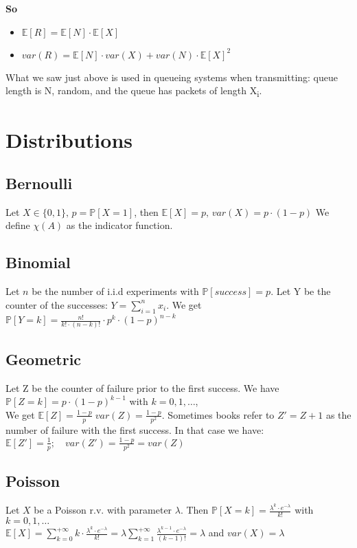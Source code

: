 \textbf{So}
\begin{itemize}
  \item $\mathbb{E}[R] = \mathbb{E}[N] \cdot \mathbb{E}[X]$
  \item $var(R) = \mathbb{E}[N] \cdot var(X) + var(N) \cdot \mathbb{E}[X]^2$
\end{itemize}

What we saw just above is used in queueing systems when transmitting: queue length is N, random,
and the queue has packets of length X\textsubscript{i}.

\section{Distributions}
\subsection{Bernoulli}
Let $X \in \{0,1\}, \, p = \mathbb{P}[X=1]$, then $\mathbb{E}[X]=p, \, var(X)=p \cdot (1-p)$
We define $\chi(A)$ as the indicator function.

\subsection{Binomial}
Let $n$ be the number of i.i.d experiments with $\mathbb{P}[success]=p$. Let Y be the counter of the successes:
$Y=\sum\limits_{i=1}^{n} x_i$. We get $\mathbb{P}[Y=k]= \frac{n!}{k! \cdot (n-k)!}\cdot p^k \cdot (1-p)^{n-k}$

\subsection{Geometric}
Let Z be the counter of failure prior to the first success. We have $\mathbb{P}[Z=k] = p \cdot (1-p)^{k-1}$ with $k=0,1,\dots$, \\
We get $\mathbb{E}[Z]=\frac{1-p}{p} \; var(Z)=\frac{1-p}{p^2}$.
Sometimes books refer to $Z'=Z+1$ as the number of failure with the first success. In that case we have:\\
$\mathbb{E}[Z']=\frac{1}{p}; \quad var(Z')=\frac{1-p}{p^2}=var(Z)$

\subsection{Poisson}
Let $X$ be a Poisson r.v. with parameter $\lambda$. Then $\mathbb{P}[X=k] =  \frac{\lambda^k \cdot e^{-\lambda}}{k!}$ with $k=0,1,\dots$
\\
$\mathbb{E}[X]=\sum\limits_{k=0}^{+\infty}k \cdot \frac{\lambda^k \cdot e^{-\lambda}}{k!}= \lambda \sum\limits_{k=1}^{+\infty}\frac{\lambda^{k-1}\cdot e^{-\lambda}}{(k-1)!}=\lambda$
and $var(X)=\lambda$

